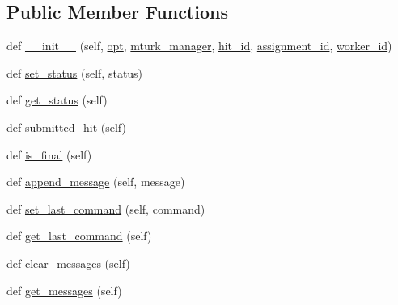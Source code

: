\subsection*{Public Member Functions}
\begin{DoxyCompactItemize}
\item 
def \hyperlink{classparlai_1_1mturk_1_1core_1_1agents_1_1MTurkAgent_a0b4906e8bb4fa84fcb33f22974743e78}{\+\_\+\+\_\+init\+\_\+\+\_\+} (self, \hyperlink{classparlai_1_1core_1_1agents_1_1Agent_ab3b45d2754244608c75d4068b90cd051}{opt}, \hyperlink{classparlai_1_1mturk_1_1core_1_1agents_1_1MTurkAgent_ae3fddc0185f75ea64b09a86628d4a1d1}{mturk\+\_\+manager}, \hyperlink{classparlai_1_1mturk_1_1core_1_1agents_1_1MTurkAgent_a4325d1370d25335d4a7ad279d7d0c615}{hit\+\_\+id}, \hyperlink{classparlai_1_1mturk_1_1core_1_1agents_1_1MTurkAgent_ada9c2a6ca3ee222f73743b2bc3a9d85f}{assignment\+\_\+id}, \hyperlink{classparlai_1_1mturk_1_1core_1_1agents_1_1MTurkAgent_a88699f19c4c7e658ae0424062cbb9d80}{worker\+\_\+id})
\item 
def \hyperlink{classparlai_1_1mturk_1_1core_1_1agents_1_1MTurkAgent_a59bc035a28a067a5408a2c15f9f94604}{set\+\_\+status} (self, status)
\item 
def \hyperlink{classparlai_1_1mturk_1_1core_1_1agents_1_1MTurkAgent_a0522b17872a4a9a22e2c0e5237f8ac82}{get\+\_\+status} (self)
\item 
def \hyperlink{classparlai_1_1mturk_1_1core_1_1agents_1_1MTurkAgent_a1bb274c3d2fbfbe79f095ef27b42d820}{submitted\+\_\+hit} (self)
\item 
def \hyperlink{classparlai_1_1mturk_1_1core_1_1agents_1_1MTurkAgent_ab7e57409d6591f78a3b9d28c5a0f98e6}{is\+\_\+final} (self)
\item 
def \hyperlink{classparlai_1_1mturk_1_1core_1_1agents_1_1MTurkAgent_aecba90740204ffc85d23649568b7eec0}{append\+\_\+message} (self, message)
\item 
def \hyperlink{classparlai_1_1mturk_1_1core_1_1agents_1_1MTurkAgent_a04a89ff05aa910e6ff8cc58e96d61b21}{set\+\_\+last\+\_\+command} (self, command)
\item 
def \hyperlink{classparlai_1_1mturk_1_1core_1_1agents_1_1MTurkAgent_a7d8989acb53debf63fc11246510f83b7}{get\+\_\+last\+\_\+command} (self)
\item 
def \hyperlink{classparlai_1_1mturk_1_1core_1_1agents_1_1MTurkAgent_af49362633aadb0306a5350dc9700e9b5}{clear\+\_\+messages} (self)
\item 
def \hyperlink{classparlai_1_1mturk_1_1core_1_1agents_1_1MTurkAgent_ae941b277cbfee3e76b543b780ca804f9}{get\+\_\+messages} (self)

\end{DoxyCompactItemize}
